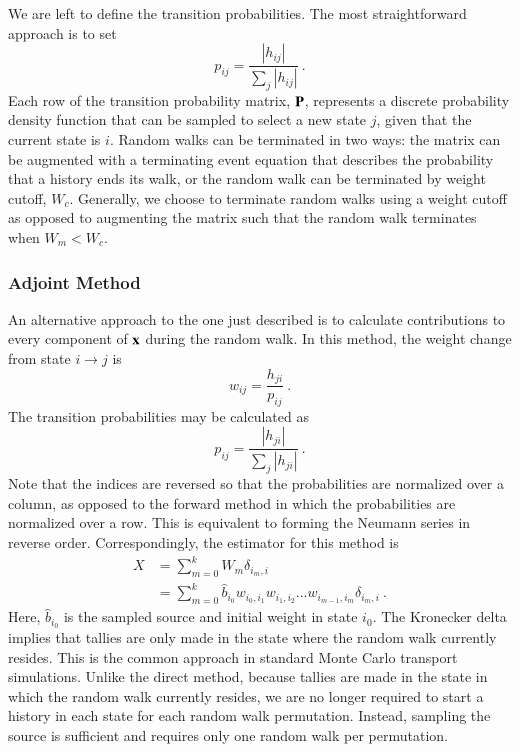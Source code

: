 \documentclass[preprint,12pt]{elsarticle}
\newcommand{\vx}{\ensuremath{\ve{x}}}
\newcommand{\vP}{\ensuremath{\ve{P}}}
\begin{document}
We are left to define the transition probabilities. The most
straightforward approach is to set
\begin{equation}
  p_{ij} = \frac{|h_{ij}|}{\sum_{j}|h_{ij}|}\:.
  \label{eq:probability}
\end{equation}
Each row of the transition probability matrix, $\vP$, represents a
discrete probability density function that can be sampled to select a
new state $j$, given that the current state is $i$.  Random walks can
be terminated in two ways: the matrix can be augmented with a
terminating event equation that describes the probability that a
history ends its walk, or the random walk can be terminated by weight
cutoff, $W_c$.  Generally, we choose to terminate random walks using a
weight cutoff as opposed to augmenting the matrix such that the random
walk terminates when $W_m < W_c$.

\subsubsection{Adjoint Method}
\label{sec:adjoint-method}

An alternative approach to the one just described is to calculate
contributions to every component of $\vx$ during the random walk. In
this method, the weight change from state $i\rightarrow j$ is
\begin{equation}
  w_{ij} = \frac{h_{ji}}{p_{ij}}\:.
  \label{eq:adjoint-weight}
\end{equation}
The transition probabilities may be calculated as
\begin{equation}
  p_{ij} = \frac{|h_{ji}|}{\sum_{j}|h_{ji}|}\:.
  \label{eq:adjoint-probability}
\end{equation}
Note that the indices are reversed so that the probabilities are normalized
over a column, as opposed to the forward method in which the probabilities are
normalized over a row.  This is equivalent to forming the Neumann series in
reverse order.  Correspondingly, the estimator for this method is
\begin{equation}
  \begin{split}
    X &= \sum_{m=0}^{k}W_m\delta_{i_m,i}\\ &=
    \sum_{m=0}^{k}\hat{b}_{i_0}w_{i_0,i_1}w_{i_1,i_2}\ldots
    w_{i_{m-1},i_m}\delta_{i_m,i}\:.
  \end{split}
  \label{eq:adjoint-tally}
\end{equation}
Here, $\hat{b}_{i_0}$ is the sampled source and initial weight in state $i_0$.
The Kronecker delta implies that tallies are only made in the state where the
random walk currently resides.  This is the common approach in standard Monte
Carlo transport simulations. Unlike the direct method, because tallies are
made in the state in which the random walk currently resides, we are no longer
required to start a history in each state for each random walk
permutation. Instead, sampling the source is sufficient and requires only one
random walk per permutation.
\end{document}
